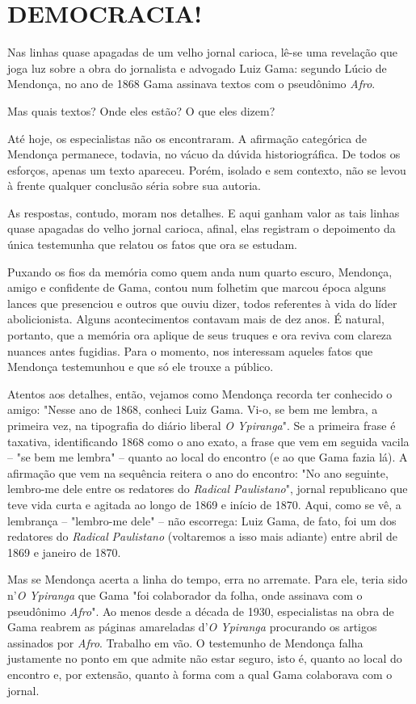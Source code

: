 \chapter{DEMOCRACIA!}

Nas linhas quase apagadas de um velho jornal carioca, lê-se uma
revelação que joga luz sobre a obra do jornalista e advogado Luiz Gama:
segundo Lúcio de Mendonça, no ano de 1868 Gama assinava textos com o
pseudônimo \emph{Afro}.

Mas quais textos? Onde eles estão? O que eles dizem?

Até hoje, os especialistas não os encontraram. A afirmação categórica de
Mendonça permanece, todavia, no vácuo da dúvida historiográfica. De
todos os esforços, apenas um texto apareceu. Porém, isolado e sem
contexto, não se levou à frente qualquer conclusão séria sobre sua
autoria.

As respostas, contudo, moram nos detalhes. E aqui ganham valor as tais
linhas quase apagadas do velho jornal carioca, afinal, elas registram o
depoimento da única testemunha que relatou os fatos que ora se estudam.

Puxando os fios da memória como quem anda num quarto escuro, Mendonça,
amigo e confidente de Gama, contou num folhetim que marcou época alguns
lances que presenciou e outros que ouviu dizer, todos referentes à vida
do líder abolicionista. Alguns acontecimentos contavam mais de dez anos.
É natural, portanto, que a memória ora aplique de seus truques e ora
reviva com clareza nuances antes fugidias. Para o momento, nos
interessam aqueles fatos que Mendonça testemunhou e que só ele trouxe a
público.

Atentos aos detalhes, então, vejamos como Mendonça recorda ter conhecido
o amigo: "Nesse ano de 1868, conheci Luiz Gama. Vi-o, se bem me lembra,
a primeira vez, na tipografia do diário liberal \emph{O Ypiranga}". Se a
primeira frase é taxativa, identificando 1868 como o ano exato, a frase
que vem em seguida vacila -- "se bem me lembra" -- quanto ao local do
encontro (e ao que Gama fazia lá). A afirmação que vem na sequência
reitera o ano do encontro: "No ano seguinte, lembro-me dele entre os
redatores do \emph{Radical Paulistano}", jornal republicano que teve
vida curta e agitada ao longo de 1869 e início de 1870. Aqui, como se
vê, a lembrança -- "lembro-me dele" -- não escorrega: Luiz Gama, de
fato, foi um dos redatores do \emph{Radical} \emph{Paulistano}
(voltaremos a isso mais adiante) entre abril de 1869 e janeiro de 1870.

Mas se Mendonça acerta a linha do tempo, erra no arremate. Para ele,
teria sido n'\emph{O Ypiranga} que Gama "foi colaborador da folha, onde
assinava com o pseudônimo \emph{Afro}". Ao menos desde a década de 1930,
especialistas na obra de Gama reabrem as páginas amareladas d'\emph{O
Ypiranga} procurando os artigos assinados por \emph{Afro}. Trabalho em
vão. O testemunho de Mendonça falha justamente no ponto em que admite
não estar seguro, isto é, quanto ao local do encontro e, por extensão,
quanto à forma com a qual Gama colaborava com o jornal.

